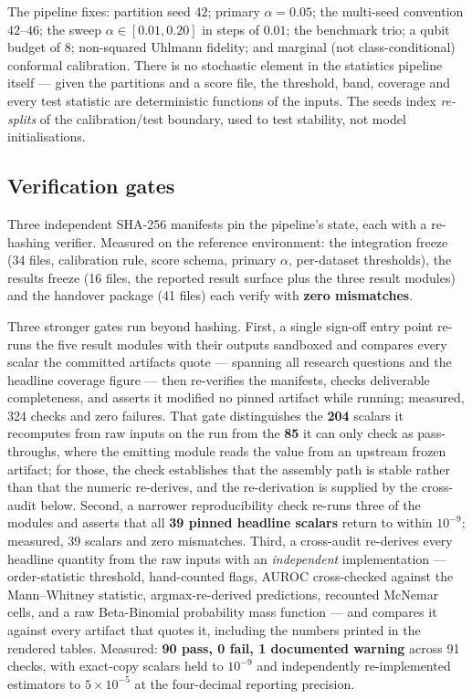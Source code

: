 The pipeline fixes: partition seed $42$; primary $\alpha = 0.05$; the multi-seed convention $42$--$46$; the
sweep $\alpha \in [0.01, 0.20]$ in steps of $0.01$; the benchmark trio; a qubit budget of $8$; non-squared
Uhlmann fidelity; and marginal (not class-conditional) conformal calibration. There is no stochastic element
in the statistics pipeline itself --- given the partitions and a score file, the threshold, band, coverage
and every test statistic are deterministic functions of the inputs. The seeds index \emph{re-splits} of the
calibration/test boundary, used to test stability, not model initialisations.

\subsection{Verification gates}

Three independent SHA-256 manifests pin the pipeline's state, each with a re-hashing verifier. Measured on
the reference environment: the integration freeze (34 files, calibration rule, score schema, primary
$\alpha$, per-dataset thresholds), the results freeze (16 files, the reported result surface plus the three
result modules) and the handover package (41 files) each verify with \textbf{zero mismatches}.

Three stronger gates run beyond hashing. First, a single sign-off entry point re-runs the five result
modules with their outputs sandboxed and compares every scalar the committed artifacts quote --- spanning
all research questions and the headline coverage figure --- then re-verifies the manifests, checks
deliverable completeness, and asserts it modified no pinned artifact while running; measured, 324 checks and
zero failures. That gate distinguishes the \textbf{204} scalars it recomputes from raw inputs on the run
from the \textbf{85} it can only check as pass-throughs, where the emitting module reads the value from an
upstream frozen artifact; for those, the check establishes that the assembly path is stable rather than that
the numeric re-derives, and the re-derivation is supplied by the cross-audit below. Second, a narrower
reproducibility check re-runs three of the modules and asserts that all \textbf{39 pinned headline scalars}
return to within $10^{-9}$; measured, 39 scalars and zero mismatches. Third, a cross-audit re-derives every
headline quantity from the raw inputs
with an \emph{independent} implementation --- order-statistic threshold, hand-counted flags, AUROC
cross-checked against the Mann--Whitney statistic, argmax-re-derived predictions, recounted McNemar cells,
and a raw Beta-Binomial probability mass function --- and compares it against every artifact that quotes it,
including the numbers printed in the rendered tables. Measured: \textbf{90 pass, 0 fail, 1 documented
warning} across 91 checks, with exact-copy scalars held to $10^{-9}$ and independently re-implemented
estimators to $5 \times 10^{-5}$ at the four-decimal reporting precision.

